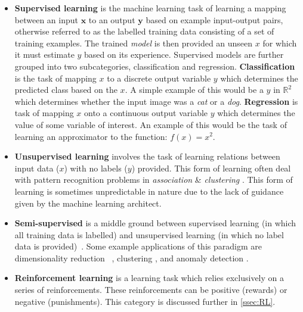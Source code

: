 \begin{itemize}

    \item \textbf{Supervised learning} is the machine learning task of learning
    a mapping between an input $\mathbf{x}$ to an output $\mathbf{y}$ based on
    example input-output pairs, otherwise referred to as the labelled training
    data consisting of a set of training examples. The trained \textit{model} is
    then provided an unseen $x$ for which it must estimate $y$ based on its
    experience. Supervised models are further grouped into two subcategories,
    classification and regression. \textbf{Classification} is the task of
    mapping $x$ to a discrete output variable $y$ which determines the predicted
    class based on the $x$. A simple example of this would be a $y$ in
    $\mathbb{R}^2$ which determines whether the input image was a \textit{cat}
    or a \textit{dog}. \textbf{Regression} is task of mapping $x$ onto a
    continuous output variable $y$ which determines the value of some variable
    of interest. An example of this would be the task of learning an
    approximator to the function: $f(x)=x^2$.

    \item \textbf{Unsupervised learning} involves the task of learning relations
    between input data ($x$) with no labels ($y$) provided. This form of learning
    often deal with pattern recognition problems in \textit{association} \&
    \textit{clustering} \cite{barlow1999ul}. This form of learning is sometimes
    unpredictable in nature due to the lack of guidance given by the machine
    learning architect.

    \item \textbf{Semi-supervised} is a middle ground between supervised
    learning (in which all training data is labelled) and unsupervised learning
    (in which no label data is provided)~\cite{books/mit/06/CSZ2006}. Some
    example applications of this paradigm are dimensionality reduction
    ~\cite{Zhang2007}, clustering \cite{Bair2013}, and anomaly detection
    \cite{DBLP:journals/corr/abs-1805-06725}.

    \item \textbf{Reinforcement learning} is a learning task which relies
    exclusively on a series of reinforcements. These reinforcements can be
    positive (rewards) or negative (punishments). This category is discussed
    further in \autoref{ssec:RL}.
\end{itemize}

